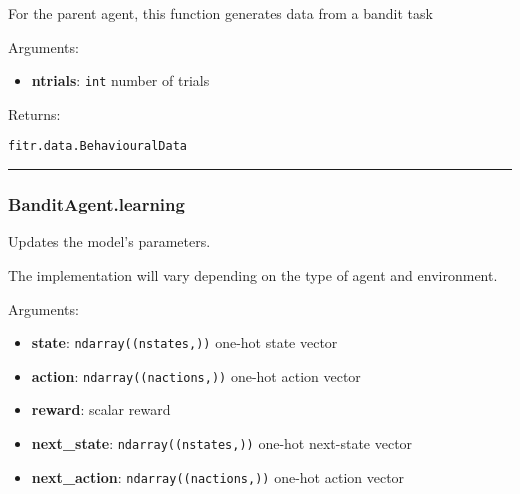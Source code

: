 \begin{Shaded}
\begin{Highlighting}[]
\end{Highlighting}
\end{Shaded}

For the parent agent, this function generates data from a bandit task

Arguments:

\begin{itemize}
\tightlist
\item
  \textbf{ntrials}: \texttt{int} number of trials
\end{itemize}

Returns:

\texttt{fitr.data.BehaviouralData}

\begin{center}\rule{0.5\linewidth}{\linethickness}\end{center}

\hypertarget{banditagent.learning}{%
\subsubsection{BanditAgent.learning}\label{banditagent.learning}}

\begin{Shaded}
\begin{Highlighting}[]
\end{Highlighting}
\end{Shaded}

Updates the model's parameters.

The implementation will vary depending on the type of agent and
environment.

Arguments:

\begin{itemize}
\tightlist
\item
  \textbf{state}: \texttt{ndarray((nstates,))} one-hot state vector
\item
  \textbf{action}: \texttt{ndarray((nactions,))} one-hot action vector
\item
  \textbf{reward}: scalar reward
\item
  \textbf{next\_state}: \texttt{ndarray((nstates,))} one-hot next-state
  vector
\item
  \textbf{next\_action}: \texttt{ndarray((nactions,))} one-hot action
  vector
\end{itemize}

